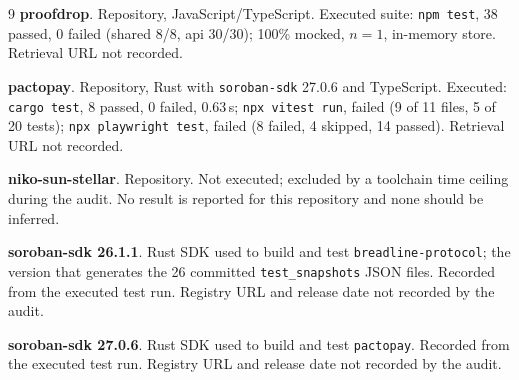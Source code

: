 \documentclass[sigconf,review]{acmart}
\begin{document}
\begin{thebibliography}{9}
  \textbf{proofdrop}.
  Repository, JavaScript/TypeScript.
  Executed suite: \texttt{npm test}, 38 passed, 0 failed (shared 8/8, api 30/30);
  100\% mocked, $n=1$, in-memory store. Retrieval URL not recorded.

  \textbf{pactopay}.
  Repository, Rust with \texttt{soroban-sdk} 27.0.6 and TypeScript.
  Executed: \texttt{cargo test}, 8 passed, 0 failed, 0.63\,s;
  \texttt{npx vitest run}, failed (9 of 11 files, 5 of 20 tests);
  \texttt{npx playwright test}, failed (8 failed, 4 skipped, 14 passed).
  Retrieval URL not recorded.

  \textbf{niko-sun-stellar}.
  Repository. Not executed; excluded by a toolchain time ceiling during the
  audit. No result is reported for this repository and none should be inferred.

  \textbf{soroban-sdk 26.1.1}.
  Rust SDK used to build and test \texttt{breadline-protocol}; the version that
  generates the 26 committed \texttt{test\_snapshots} JSON files.
  Recorded from the executed test run. Registry URL and release date not
  recorded by the audit.

  \textbf{soroban-sdk 27.0.6}.
  Rust SDK used to build and test \texttt{pactopay}. Recorded from the executed
  test run. Registry URL and release date not recorded by the audit.

\end{thebibliography}
\end{document}
